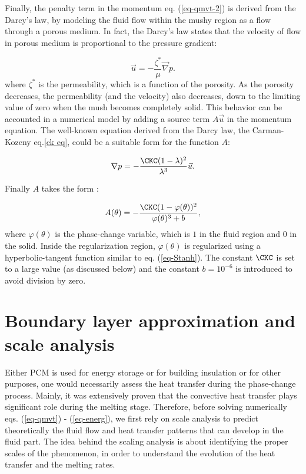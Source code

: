 Finally, the penalty term in the momentum eq. (\ref{eq-qmvt-2}) is derived from the Darcy's law, by modeling the fluid flow within the mushy region as a flow through a porous medium.
In fact, the Darcy's law states that the velocity of flow in porous medium is proportional to the pressure gradient:

\begin{equation}
	\vec u = - \frac{\zeta^*}{\mu} \vec \nabla p.
\end{equation}
where $\zeta^*$ is the permeability, which is a function of the porosity.
As the porosity decreases, the permeability (and the velocity) also decreases, down to the limiting value of zero when the mush becomes completely solid.
This behavior can be accounted in a numerical model by adding a source term $A \vec u$ in the momentum equation.
The well-known equation derived from the Darcy law, the Carman-Kozeny eq.\ref{ck eq}, could be a suitable form for the function $A$:

\begin{equation} \label{ck eq}
	\nabla p = - \frac{\CKC (1 - \lambda)^2}{\lambda^3} \vec u.
\end{equation}

Finally $A$ takes the form \citep{Belhamadia2012,kheirabadi2015effect}:

\begin{equation}\label{eq-CK}
A(\theta) = -\frac{\CKC (1 - \varphi(\theta))^2}{\varphi(\theta)^3 + b},
\end{equation}
where $\varphi(\theta)$ is the phase-change variable, which is  $1$ in the fluid region and $0$ in the solid. Inside the regularization region,  $\varphi(\theta)$ is regularized using a hyperbolic-tangent function similar to eq. (\ref{eq-Stanh}).
The constant $\CKC$ is set to a  large value (as discussed below) and  the constant $b=10^{-6}$ is introduced to avoid division by zero.

\section{Boundary layer approximation and scale analysis}
Either PCM is used for energy storage or for building insulation or for other purposes, one would necessarily assess the heat transfer during the phase-change process.
Mainly, it was extensively proven that the convective heat transfer plays significant role during the melting stage.
Therefore, before solving numerically eqs. (\ref{eq-qmvt}) - (\ref{eq-energ}), we first rely on scale analysis to predict theoretically the fluid flow and heat transfer patterns that can develop in the fluid part.
The idea behind the scaling analysis is about identifying the proper scales of the phenomenon, in order to understand the evolution of the heat transfer and the melting rates.

